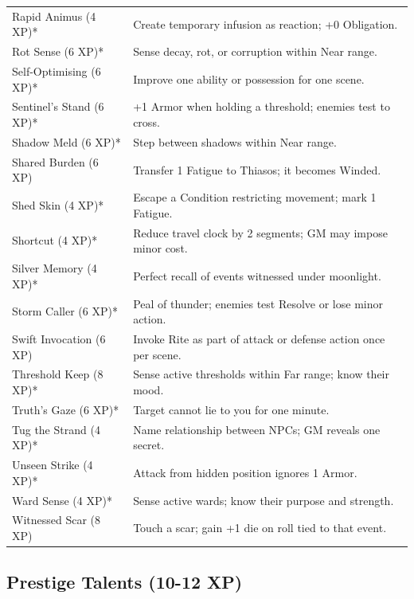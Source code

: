 \begin{longtable}{p{} p{}}
Rapid Animus (4 XP)* & Create temporary infusion as reaction; +0 Obligation. \\
Rot Sense (6 XP)* & Sense decay, rot, or corruption within Near range. \\
Self-Optimising (6 XP)* & Improve one ability or possession for one scene. \\
Sentinel's Stand (6 XP)* & +1 Armor when holding a threshold; enemies test to cross. \\
Shadow Meld (6 XP)* & Step between shadows within Near range. \\
Shared Burden (6 XP) & Transfer 1 Fatigue to Thiasos; it becomes Winded. \\
Shed Skin (4 XP)* & Escape a Condition restricting movement; mark 1 Fatigue. \\
Shortcut (4 XP)* & Reduce travel clock by 2 segments; GM may impose minor cost. \\
Silver Memory (4 XP)* & Perfect recall of events witnessed under moonlight. \\
Storm Caller (6 XP)* & Peal of thunder; enemies test Resolve or lose minor action. \\
Swift Invocation (6 XP) & Invoke Rite as part of attack or defense action once per scene. \\
Threshold Keep (8 XP)* & Sense active thresholds within Far range; know their mood. \\
Truth's Gaze (6 XP)* & Target cannot lie to you for one minute. \\
Tug the Strand (4 XP)* & Name relationship between NPCs; GM reveals one secret. \\
Unseen Strike (4 XP)* & Attack from hidden position ignores 1 Armor. \\
Ward Sense (4 XP)* & Sense active wards; know their purpose and strength. \\
Witnessed Scar (8 XP) & Touch a scar; gain +1 die on roll tied to that event. \\
\hline
\end{longtable}

\subsection{Prestige Talents (10-12 XP)}

